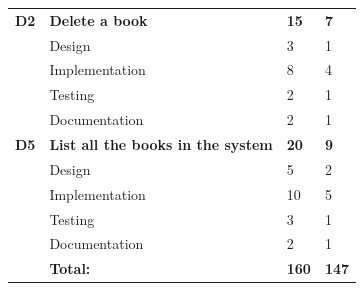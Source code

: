 \begin{table}
\begin{tabular}{ l p{8cm} l l }
\bf{D2}	  &\bf{Delete a book}				&\bf{15}		&\bf{7}		     \\
		  &Design							&3			&1		\\
		  &Implementation					&8			&4		\\
		  &Testing						&2			&1		\\
		  &Documentation					&2			&1		\\

 \bf{D5}	  &\bf{List all the books in the system}	&\bf{20}		&\bf{9}		     \\
		  &Design							&5			&2		\\
		  &Implementation					&10			&5		\\
		  &Testing						&3			&1		\\
		  &Documentation					&2			&1		\\
\hline 
		  &\bf{Total:}						&\bf{160}		&\bf{147}		\\
\hline
\end{tabular}
\label{table:sp1backlog}
\end{table}


